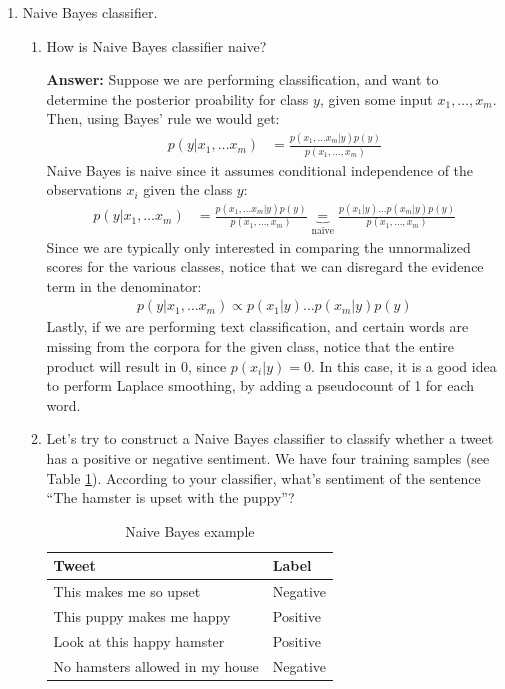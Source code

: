\documentclass{article}
\newenvironment{QandA}{\begin{enumerate}[label=\arabic*.]}{\end{enumerate}}
\newenvironment{InnerQandA}{\begin{enumerate}[label=\roman*.]}{\end{enumerate}}
\newenvironment{answer}{\par\normalfont \textbf{Answer:}}{}
\newcommand{\g}{\vert}
\begin{document}
\begin{QandA}
    \item Naive Bayes classifier.
    \begin{InnerQandA}
        \item How is Naive Bayes classifier naive?
        \begin{answer}
            Suppose we are performing classification, and want to determine the posterior proability for class $y$, given some input $x_1, \ldots, x_m$. Then, using Bayes' rule we would get:
            \begin{align*}
                p(y \g x_1, \ldots x_m) &= \frac{p(x_1, \ldots x_m \g y) p(y)}{p(x_1, \ldots, x_m)}
            \end{align*}
            Naive Bayes is naive since it assumes conditional independence of the observations $x_i$ given the class $y$:
            \begin{align*}
                p(y \g x_1, \ldots x_m) &= \frac{p(x_1, \ldots x_m \g y) p(y)}{p(x_1, \ldots, x_m)} \underbrace{=}_{\text{naive}} \frac{p(x_1 \g y) \hdots p(x_m \g y) p(y)}{p(x_1, \ldots, x_m)}
            \end{align*} 
            Since we are typically only interested in comparing the unnormalized scores for the various classes, notice that we can disregard the evidence term in the denominator:
            \begin{align*}
                p(y \g x_1, \ldots x_m) \propto p(x_1 \g y) \hdots p(x_m \g y) p(y)
            \end{align*}
            Lastly, if we are performing text classification, and certain words are missing from the corpora for the given class, notice that the entire product will result in $0$, since $p(x_i \g y) = 0$. In this case, it is a good idea to perform Laplace smoothing, by adding a pseudocount of 1 for each word.
        \end{answer}

        \item Let’s try to construct a Naive Bayes classifier to classify whether a tweet has a positive or negative sentiment. We have four training samples (see Table \ref{tab:naive-bayes}). According to your classifier, what's sentiment of the sentence ``The hamster is upset with the puppy''?
        \begin{table}[h!]
        \centering
        \begin{tabular}{|l|l|}
        \hline
        \textbf{Tweet}                  & \textbf{Label} \\ \hline
        This makes me so upset          & Negative       \\ \hline
        This puppy makes me happy       & Positive       \\ \hline
        Look at this happy hamster      & Positive       \\ \hline
        No hamsters allowed in my house & Negative       \\ \hline
        \end{tabular}
        \caption{Naive Bayes example}
        \label{tab:naive-bayes}
        \end{table}
        

\end{InnerQandA}
\end{QandA}
\end{document}
